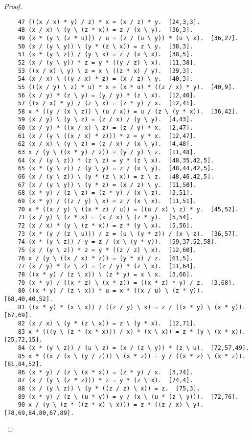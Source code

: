 \documentclass[12pt]{report}
\theoremstyle{definition}
\begin{document}
\begin{proof}
\begin{lstlisting}
  	47 (((x / x) * y) / z) * x = (x / z) * y.  [24,3,3].
  	48 (x / x) \ (y \ (z * x)) = z / (x \ y).  [36,3].
  	49 (x * (y \ (z * u))) / u = (z / (u \ y)) * (u \ x).  [36,27].
  	50 (x / (y \ y)) \ (y * (z \ x)) = z \ y.  [38,3].
  	51 (x * (y \ z)) / (y \ x) = z / (x \ x).  [38,5].
  	52 (x / (y \ y)) * z = y * ((y / z) \ x).  [11,38].
  	53 ((x / x) \ y) \ z = x \ ((z * x) / y).  [39,3].
  	54 (x / x) \ ((y / x) * z) = (x / z) \ y.  [40,3].
  	55 (((x / y) \ z) * u) * x = (x * u) * ((z / x) * y).  [40,9].
  	56 (x / y) * (z \ y) = (y / y) * (z \ x).  [12,40].
  	57 ((x / x) * y) / (z \ x) = (z * y) / x.  [12,41].
  	58 x * ((y / (x \ z)) \ (u / x)) = u / (z \ (y * x)).  [36,42].
  	59 (x / y) \ (y \ z) = (z / x) / (y \ y).  [4,43].
  	60 (x / y) * ((x / x) \ z) = (z / y) * x.  [2,47].
  	61 (x / (y \ ((x / x) * z))) * z = y * x.  [12,47].
  	62 (x / x) \ (y \ z) = (z / x) / (x \ y).  [4,48].
  	63 x / (y \ ((x * y) / z)) = (y / y) \ z.  [11,48].
  	64 (x / (y \ z)) * (z \ z) = y * (z \ x).  [48,35,42,5].
  	65 (x * (y \ z)) / (y \ y) = z / (x \ y).  [48,44,42,5].
  	66 (x / (y \ z)) \ (y * (z \ x)) = z \ z.  [48,46,42,5].
  	67 (x / (y \ y)) \ (y * z) = (x / z) \ y.  [11,50].
  	68 (x * y) / (z \ z) = (z * y) / (x \ z).  [3,51].
  	69 (x * y) / ((z / y) \ x) = z / (x \ x).  [11,51].
  	70 x * ((x / y) \ ((x * z) / u)) = ((u / x) \ z) * y.  [45,52].
  	71 (x / y) \ (z * x) = (x / x) \ (z * y).  [5,54].
  	72 (x / x) * (y \ (z * x)) = z * (y \ x).  [5,56].
  	73 (x * (y / (z \ u))) / z = (u \ (y * z)) / (x \ z).  [36,57].
  	74 (x * (y \ z)) / y = z / (x \ (y * y)).  [59,37,52,58].
  	75 (x / (y \ z)) * z = y * ((z / z) \ x).  [12,60].
  	76 x / (y \ ((x / x) * z)) = (y * x) / z.  [61,5].
  	77 (x / y) * (z \ z) = (z / y) * (z \ x).  [11,64].
  	78 ((x * y) / (z \ x)) \ (z * y) = x \ x.  [3,66].
  	79 (x * y) / ((x * z) \ (x * z)) = ((x * z) * y) / z.  [3,68].
  	80 ((x * y) / (z \ x)) * u = x * ((x / u) \ (z * y)).  [68,40,40,52].
  	81 ((x * y) * (x \ x)) / ((z / y) \ x) = z / ((x * y) \ (x * y)).  [67,69].
  	82 (x / x) \ (y * (z \ x)) = z \ (y * x).  [12,71].
  	83 x * (((y \ (z * (x * x))) / x) * (x \ x)) = z * (y \ (x * x)).  [25,72,15].
  	84 (x * (y \ z)) / (u \ z) = (x / (z \ y)) * (z \ u).  [72,57,49].
  	85 x * ((x / (x \ (y / z))) \ (x * z)) = y / ((x * z) \ (x * z)).  [81,84,52].
  	86 (x * y) / (z \ (x * x)) = (z * y) / x.  [3,74].
  	87 (x / (y \ (z * z))) * z = y * (z \ x).  [74,4].
  	88 (x / (y \ z)) \ (y * ((z / z) \ x)) = z.  [75,3].
  	89 (x * y) / (z \ (u * y)) = y / (x \ (u * (z \ y))).  [72,76].
  	90 x / (y \ (z * ((z * x) \ x))) = z * ((z / x) \ y).  [78,69,84,80,67,89].

\end{lstlisting}
\end{proof}
\end{document}
